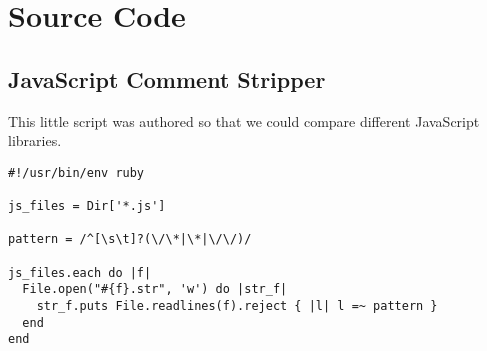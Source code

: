 \chapter{Source Code}

\section{JavaScript Comment Stripper}
\label{section:source.code.javascript.comment.stripper}

This little script was authored so that we could
compare different JavaScript libraries.


\begin{sourcecode}
\lstset{language=Ruby}
\begin{lstlisting}
#!/usr/bin/env ruby

js_files = Dir['*.js']

pattern = /^[\s\t]?(\/\*|\*|\/\/)/

js_files.each do |f|
  File.open("#{f}.str", 'w') do |str_f| 
    str_f.puts File.readlines(f).reject { |l| l =~ pattern }
  end
end
\end{lstlisting}
  \caption[JavaScript Comment Stripping]{%
          Strips comments from JavaScript libraries}
  \label{sourcecode:javascript.comment.sripping}
\end{sourcecode}
